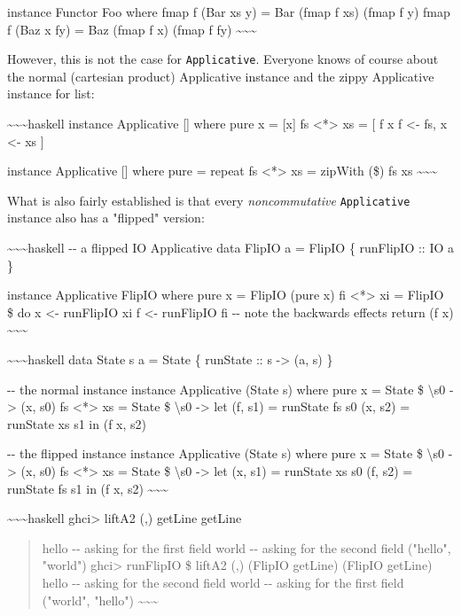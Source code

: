 \documentclass[]{article}
\begin{document}
instance Functor Foo where fmap f (Bar xs y) = Bar (fmap f xs) (fmap f y) fmap f
(Baz x fy) = Baz (fmap f x) (fmap f fy)
\textasciitilde{}\textasciitilde{}\textasciitilde{}

However, this is not the case for \texttt{Applicative}. Everyone knows of course
about the normal (cartesian product) Applicative instance and the zippy
Applicative instance for list:

\textasciitilde{}\textasciitilde{}\textasciitilde{}haskell instance Applicative
{[}{]} where pure x = {[}x{]} fs \textless{}*\textgreater{} xs = {[} f x
\textbar{} f \textless{}- fs, x \textless{}- xs {]}

instance Applicative {[}{]} where pure = repeat fs \textless{}*\textgreater{} xs
= zipWith (\$) fs xs \textasciitilde{}\textasciitilde{}\textasciitilde{}

What is also fairly established is that every \emph{noncommutative}
\texttt{Applicative} instance also has a "flipped" version:

\textasciitilde{}\textasciitilde{}\textasciitilde{}haskell -\/- a flipped IO
Applicative data FlipIO a = FlipIO \{ runFlipIO :: IO a \}

instance Applicative FlipIO where pure x = FlipIO (pure x) fi
\textless{}*\textgreater{} xi = FlipIO \$ do x \textless{}- runFlipIO xi f
\textless{}- runFlipIO fi -\/- note the backwards effects return (f x)
\textasciitilde{}\textasciitilde{}\textasciitilde{}

\textasciitilde{}\textasciitilde{}\textasciitilde{}haskell data State s a =
State \{ runState :: s -\textgreater{} (a, s) \}

-\/- the normal instance instance Applicative (State s) where pure x = State \$
\textbackslash{}s0 -\textgreater{} (x, s0) fs \textless{}*\textgreater{} xs =
State \$ \textbackslash{}s0 -\textgreater{} let (f, s1) = runState fs s0 (x, s2)
= runState xs s1 in (f x, s2)

-\/- the flipped instance instance Applicative (State s) where pure x = State \$
\textbackslash{}s0 -\textgreater{} (x, s0) fs \textless{}*\textgreater{} xs =
State \$ \textbackslash{}s0 -\textgreater{} let (x, s1) = runState xs s0 (f, s2)
= runState fs s1 in (f x, s2)
\textasciitilde{}\textasciitilde{}\textasciitilde{}

\textasciitilde{}\textasciitilde{}\textasciitilde{}haskell ghci\textgreater{}
liftA2 (,) getLine getLine

\begin{quote}
hello -\/- asking for the first field world -\/- asking for the second field
("hello", "world") ghci\textgreater{} runFlipIO \$ liftA2 (,) (FlipIO getLine)
(FlipIO getLine) hello -\/- asking for the second field world -\/- asking for
the first field ("world", "hello")
\textasciitilde{}\textasciitilde{}\textasciitilde{}
\end{quote}
\end{document}
